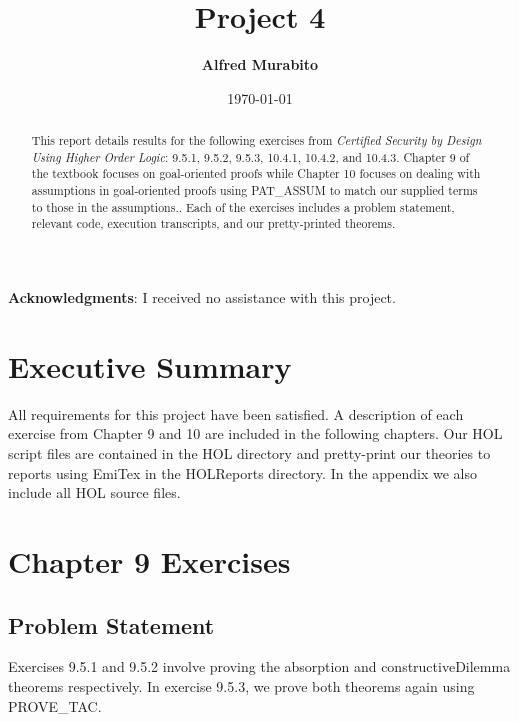 \documentclass[11pt, twoside]{article}
\title{Project 4}
\author{\textbf{Alfred Murabito}}
\date{\today}
\begin{document}
\maketitle{}

\newpage

\begin{abstract}
   \noindent{}This report details results for the following exercises from \textit{Certified Security by Design Using Higher Order Logic}: 9.5.1, 9.5.2, 9.5.3, 10.4.1, 10.4.2, and 
10.4.3.  Chapter 9 of the textbook focuses on goal-oriented proofs while  Chapter 10 focuses on dealing with assumptions in goal-oriented proofs using PAT_ASSUM to match our supplied
terms to those in the assumptions..  Each of the exercises includes a problem statement, relevant code, execution transcripts, and our pretty-printed theorems. 
\end{abstract}

\newpage

\textbf{Acknowledgments}: I received no assistance with this project.

\newpage

\tableofcontents

\newpage

\section{Executive Summary}
\label{sec:executive-summary}

All requirements for this project have been satisfied.  A description of each exercise from Chapter 9 and 10 are included in the following chapters.  
Our HOL script files are contained in the HOL directory and pretty-print our theories to reports using EmiTex in the HOLReports directory. In the appendix
we also include all HOL source files.

\newpage


\section{Chapter 9 Exercises}
\label{sec:Chap9}

\subsection{Problem Statement}
Exercises 9.5.1 and 9.5.2 involve proving the absorption and constructiveDilemma theorems respectively. In exercise 9.5.3, we prove both theorems again using PROVE_TAC.
\end{document}
